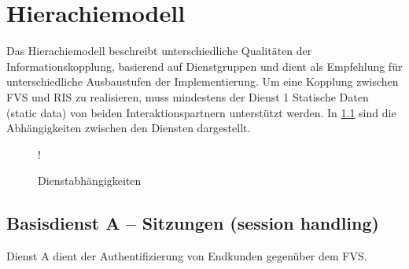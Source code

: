 \chapter{Hierachiemodell}
\label{cha:Hierachiemodell}
Das Hierachiemodell beschreibt unterschiedliche Qualitäten der Informationskopplung, basierend auf Dienstgruppen und dient als Empfehlung für unterschiedliche Ausbaustufen der Implementierung.
Um eine Kopplung zwischen FVS und RIS zu realisieren, muss mindestens der Dienst 1 Statische Daten (static data) von beiden Interaktionspartnern unterstützt werden. In \cref{fig:depend} sind die Abhängigkeiten zwischen den Diensten dargestellt.

\begin{figure}[h]
  \centering
  \resizebox {\columnwidth} {!} {
  }
  \caption{Dienstabhängigkeiten \label{fig:depend}}
\end{figure}


\section{Basisdienst A -- Sitzungen (session handling)}
\label{sec:Hierachiemodell:BasisdientA}
Dienst A dient der Authentifizierung von Endkunden gegenüber dem FVS.


